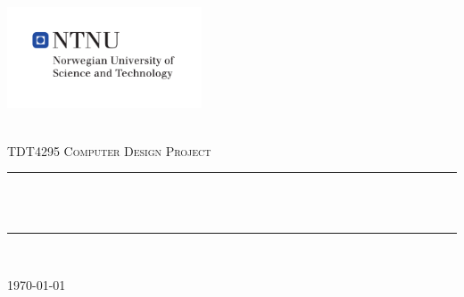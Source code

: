 \begin{titlepage}
\includegraphics[height=3cm]{images/ntnu_logo.pdf}\\[1cm]   

\begin{center}
 
~\\[1.5cm]

\textsc{\Large TDT4295 Computer Design Project}\\[0.5cm]

\hrule ~\\[0.2cm]
{\huge \bfseries \mytitle}\\[0.9cm]		%
\hrule ~\\[1.5cm]

\begin{minipage}{0.4\textwidth}
    \centering
	\large
		\myauthor
\end{minipage}

\vfill

{\large \today}

\end{center}
\end{titlepage}
